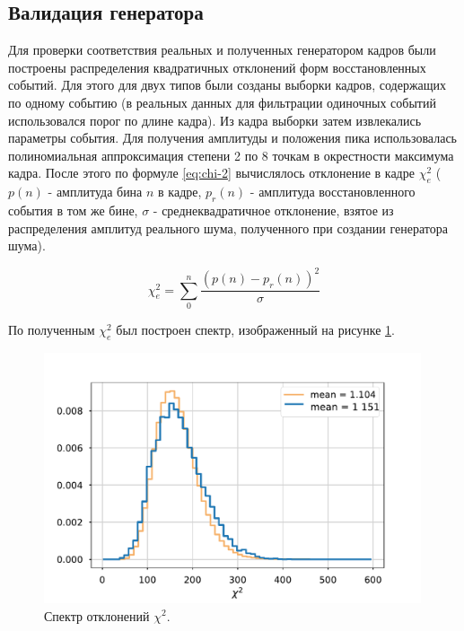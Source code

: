 \documentclass[a4paper,14pt]{extreport}
\begin{document}
\subsection{Валидация генератора}\label{generator-validation-1}

Для проверки соответствия реальных и полученных генератором кадров были построены распределения квадратичных отклонений форм восстановленных событий. Для этого для двух типов были созданы выборки кадров, содержащих по одному событию (в реальных данных для фильтрации одиночных событий использовался порог по длине кадра). Из кадра выборки затем извлекались параметры события. Для получения амплитуды и положения пика использовалась полиномиальная аппроксимация степени 2 по 8 точкам в окрестности максимума кадра. После этого по формуле \ref{eq:chi-2} вычислялось отклонение в кадре $ \chi^2_e $ ($p(n)$ - амплитуда бина $ n $ в кадре, $p_r(n)$ - амплитуда восстановленного события в том же бине, $ \sigma $ - среднеквадратичное отклонение, взятое из распределения амплитуд реального шума, полученного при создании генератора шума).

\begin{equation}\label{eq:chi-2}
    \chi^2_{e} = \sum_{0}^{n} \frac{(p(n) - p_r(n))^2}{\sigma}
\end{equation}

По полученным $ \chi^2_e $ был построен спектр, изображенный на рисунке \ref{fig:signals-chi2}.

\begin{figure}
  \centering
  \includegraphics[width = 0.99\textwidth]{img/signals/chi2-python.pdf}
  \caption{Спектр отклонений $ \chi^2 $.}
  \label{fig:signals-chi2}
\end{figure}
\end{document}
